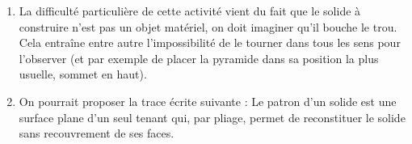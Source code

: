 \begin{corrige}
\begin{enumerate}
\begin{enumerate}
\begin{itemize}
      \end{itemize}
   \end{enumerate}
   \item La difficulté particulière de cette activité vient du fait que le solide à construire n’est pas un objet matériel, on doit imaginer qu’il bouche le trou. Cela entraîne entre autre l’impossibilité de le tourner dans tous les sens pour l’observer (et par exemple de placer la pyramide dans sa position la plus usuelle, sommet en haut). \\
   \item On pourrait proposer la trace écrite suivante : \og Le patron d’un solide est une surface plane d’un seul tenant qui, par pliage, permet de reconstituer le solide sans recouvrement de ses faces. \fg{}
\end{enumerate}
\end{corrige}

\bigskip


